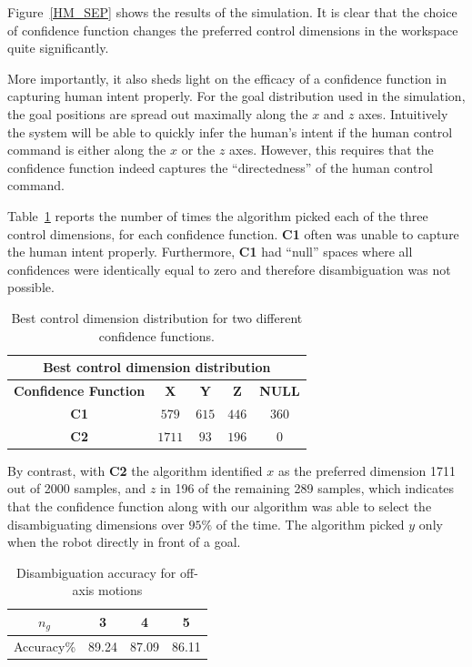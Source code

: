 \documentclass[conference]{IEEEtran}
\begin{document}
Figure~\ref{HM_SEP} shows the results of the simulation. It is clear that the choice of confidence function changes the preferred control dimensions in the workspace quite significantly. 

More importantly, it also sheds light on the efficacy of a confidence function in capturing human intent properly. For the goal distribution used in the simulation, the goal positions are spread out maximally along the $x$ and $z$ axes. Intuitively the system will be able to quickly infer the human's intent if the human control command is either along the $x$ or the $z$ axes. However, this requires that the confidence function indeed captures the ``directedness'' of the human control command. 

Table~\ref{HMD} reports the number of times the algorithm picked each of the three control dimensions, for each confidence function.  
\textbf{C1} often was unable to capture the human intent properly. Furthermore, \textbf{C1} had ``null'' spaces where all confidences were identically equal to zero and therefore disambiguation was not possible.  
\begin{table}[t]
	\centering
	\begin{tabular}{|c|c|c|c|c|}
		\hline
		\multicolumn{5}{|c|}{Best control dimension distribution} \\
		\hline
		\textbf{Confidence Function} & \textbf{X} & \textbf{Y} & \textbf{Z} & \textbf{NULL} \\ \hline
		
		\textbf{C1} & $579$ & $615$ & $446$ & $360$ \\ \hline
		\textbf{C2} & $1711$ & $93$ & $196$ & $0$\\ \hline
		
	\end{tabular}
	\vspace{.2cm}
	\caption{Best control dimension distribution for two different confidence functions.} 
	\label{HMD}
	\vspace{-.5cm}
\end{table}

By contrast, with \textbf{C2} the algorithm identified $x$ as the preferred dimension 1711 out of 2000 samples, and $z$ in 196 of the remaining 289 samples, which indicates that the confidence function along with our algorithm was able to select the disambiguating dimensions over $95\%$ of the time. The algorithm picked $y$ only when the robot directly in front of a goal. 
\begin{table}[h]
	\centering
	\begin{tabular}{|c|c|c|c|}
		\hline
		$n_g$ & 3 & 4 & 5 \\
		\hline
		Accuracy\% & 89.24 & 87.09 & 86.11 \\
		\hline
	\end{tabular}
	\vspace{.2cm}
	\caption{Disambiguation accuracy for off-axis motions} 
	\label{SIM}
	\vspace{-.5cm}
\end{table}
\end{document}
